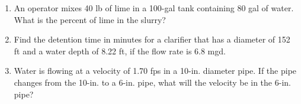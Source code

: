 \documentclass{article}
\begin{document}
 


\begin{enumerate}

\item An operator mixes 40 lb of lime in a 100-gal tank containing 80 gal of water. What is the percent of lime in the slurry?\\
\vspace{0.3cm}

\newpage


\item Find the detention time in minutes for a clarifier that has a diameter of 152 ft and a water depth of 8.22 ft, if the flow rate is 6.8 mgd.
\newpage


\item Water is flowing at a velocity of 1.70 fps in a 10-in. diameter pipe. If the pipe changes from the 10-in. to a 6-in. pipe, what will the velocity be in the 6-in. pipe?



\end{enumerate}
\end{document}
